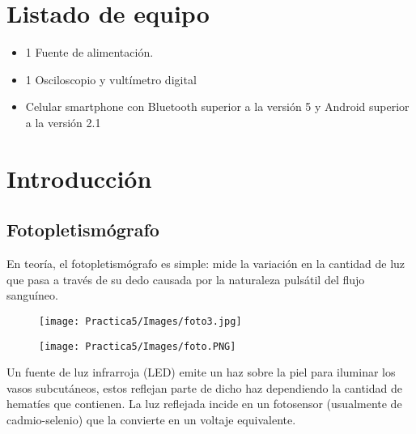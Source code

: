 \documentclass[12pt]{article}
\begin{document}
    \section{Listado de equipo}
      \begin{multicols}{2}
        \begin{itemize}
            \item 1 Fuente de alimentación.
            \columbreak
            \item 1 Osciloscopio y vultímetro digital
            \item Celular smartphone con Bluetooth superior a la versión 5 y Android superior a la versión 2.1
        \end{itemize}
        \end{multicols}
        
    

    \section{Introducción}
        \subsection{Fotopletismógrafo}
        En teoría, el fotopletismógrafo es simple: mide la variación en la cantidad de luz que pasa a través de su dedo causada por la naturaleza pulsátil del flujo sanguíneo.
        
        \begin{figure}[h!]
                \centering
                \texttt{[image: Practica5/Images/foto3.jpg]}
            \end{figure}
            
        \begin{figure}[h!]
                \centering
                \texttt{[image: Practica5/Images/foto.PNG]}
            \end{figure}
        
        
        Un fuente de luz infrarroja (LED) emite un haz sobre la piel para iluminar los vasos subcutáneos, estos reflejan parte de dicho haz dependiendo la cantidad de hematíes que contienen. La luz reflejada incide en un fotosensor (usualmente de cadmio-selenio) que la convierte en un voltaje equivalente. 
        
\end{document}
